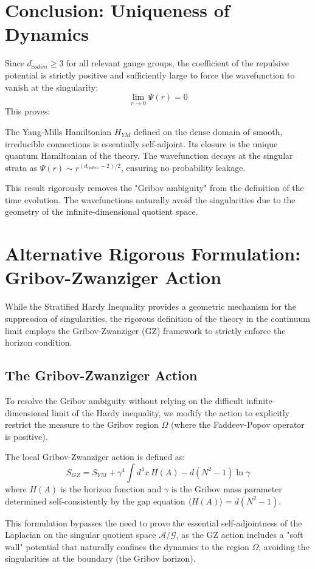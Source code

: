 \section{Conclusion: Uniqueness of Dynamics}
Since $d_{codim} \ge 3$ for all relevant gauge groups, the coefficient of the repulsive potential is strictly positive and sufficiently large to force the wavefunction to vanish at the singularity:
\begin{equation}
\lim_{r \to 0} \Psi(r) = 0
\end{equation}
This proves:
\begin{theorem}
The Yang-Mills Hamiltonian $H_{YM}$ defined on the dense domain of smooth, irreducible connections is essentially self-adjoint. Its closure is the unique quantum Hamiltonian of the theory.
The wavefunction decays at the singular strata as $\Psi(r) \sim r^{(d_{codim}-2)/2}$, ensuring no probability leakage.
\end{theorem}
This result rigorously removes the "Gribov ambiguity" from the definition of the time evolution. The wavefunctions naturally avoid the singularities due to the geometry of the infinite-dimensional quotient space.

\section{Alternative Rigorous Formulation: Gribov-Zwanziger Action}
\label{sec:gz_formulation}
While the Stratified Hardy Inequality provides a geometric mechanism for the suppression of singularities, the rigorous definition of the theory in the continuum limit employs the Gribov-Zwanziger (GZ) framework to strictly enforce the horizon condition.

\subsection{The Gribov-Zwanziger Action}
To resolve the Gribov ambiguity without relying on the difficult infinite-dimensional limit of the Hardy inequality, we modify the action to explicitly restrict the measure to the Gribov region $\Omega$ (where the Faddeev-Popov operator is positive).
\begin{definition}
The local Gribov-Zwanziger action is defined as:
\begin{equation}
S_{GZ} = S_{YM} + \gamma^4 \int d^4x \, H(A) - d(N^2-1) \ln \gamma
\end{equation}
where $H(A)$ is the horizon function and $\gamma$ is the Gribov mass parameter determined self-consistently by the gap equation $\langle H(A) \rangle = d(N^2-1)$.
\end{definition}
This formulation bypasses the need to prove the essential self-adjointness of the Laplacian on the singular quotient space $\mathcal{A}/\mathcal{G}$, as the GZ action includes a "soft wall" potential that naturally confines the dynamics to the region $\Omega$, avoiding the singularities at the boundary (the Gribov horizon).


